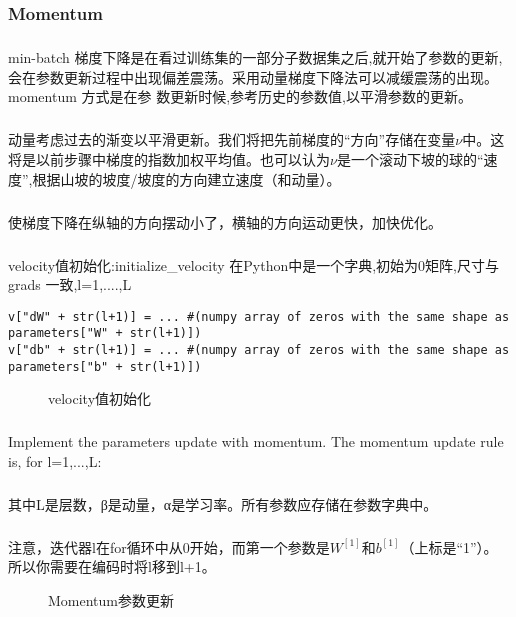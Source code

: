 \documentclass{article}
\begin{document}
\begin{CJK}{UTF8}{gbsn}
\subsubsection{Momentum}
\subparagraph{}
min-batch 梯度下降是在看过训练集的一部分子数据集之后,就开始了参数的更新,会在参数更新过程中出现偏差震荡。采用动量梯度下降法可以减缓震荡的出现。momentum 方式是在参
数更新时候,参考历史的参数值,以平滑参数的更新。
\subparagraph{}
动量考虑过去的渐变以平滑更新。我们将把先前梯度的“方向”存储在变量$\nu$中。这将是以前步骤中梯度的指数加权平均值。也可以认为$\nu$是一个滚动下坡的球的“速度”,根据山坡的坡度/坡度的方向建立速度（和动量）。
\subparagraph{}
使梯度下降在纵轴的方向摆动小了，横轴的方向运动更快，加快优化。
\subparagraph{}
velocity值初始化:initialize\_{}velocity 在Python中是一个字典,初始为0矩阵,尺寸与 grads 一致,l=1,....,L
\begin{verbatim}
v["dW" + str(l+1)] = ... #(numpy array of zeros with the same shape as parameters["W" + str(l+1)])
v["db" + str(l+1)] = ... #(numpy array of zeros with the same shape as parameters["b" + str(l+1)])
\end{verbatim}
\begin{figure}[H]
\label{fig:45}
\caption{velocity值初始化}
\end{figure}
\subparagraph{}
Implement the parameters update with momentum. The momentum update rule is, for l=1,...,L:
\begin{figure}[H]
\label{fig:6}
\end{figure}
\subparagraph{}
其中L是层数，β是动量，α是学习率。所有参数应存储在参数字典中。
\subparagraph{}
注意，迭代器l在for循环中从0开始，而第一个参数是$W^{[1]}$和$b^{[1]}$（上标是“1”）。 所以你需要在编码时将l移到l+1。
\begin{figure}[H]
\label{fig:47}
\caption{Momentum参数更新}
\end{figure}

\end{CJK}
\end{document}
